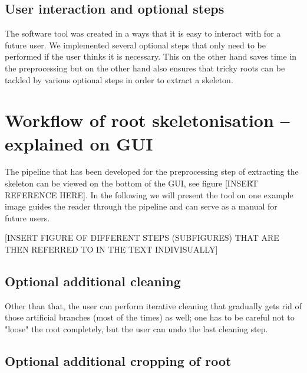 \subsection{User interaction and optional steps}
The software tool was created in a ways that it is easy to interact with for a future user. 
We implemented several optional steps that only need to be performed if the user thinks it is necessary. This on the other hand saves time in the preprocessing but on the other hand also ensures that tricky roots can be tackled by various optional steps in order to extract a skeleton. 


\section{Workflow of root skeletonisation -- explained on GUI}

The pipeline that has been developed for the preprocessing step of extracting the skeleton can be viewed on the bottom of the GUI, see figure [INSERT REFERENCE HERE].
In the following we will present the tool on one example image guides the reader through the pipeline and can serve as a manual for future users.

[INSERT FIGURE OF DIFFERENT STEPS (SUBFIGURES) THAT ARE THEN REFERRED TO IN THE TEXT INDIVISUALLY]


\subsection{Optional additional cleaning}

Other than that, the user can perform iterative cleaning that gradually gets rid of those artificial branches (most of the times) as well; one has to be careful not to "loose" the root completely, but the user can undo the last cleaning step. 

\subsection{Optional additional cropping of root}

